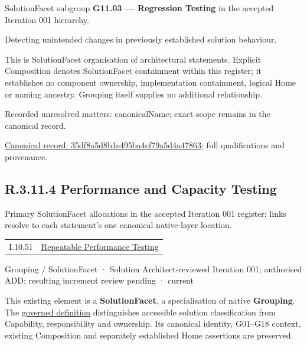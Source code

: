 SolutionFacet subgroup \textbf{G11.03 — Regression Testing} in the accepted Iteration 001 hierarchy.



Detecting unintended changes in previously established solution behaviour.



This is SolutionFacet organisation of architectural statements. Explicit Composition denotes SolutionFacet containment within this register; it establishes no component ownership, implementation containment, logical Home or naming ancestry. Grouping itself supplies no additional relationship.


{\small Recorded unresolved matters: canonicalName; exact scope remains in the canonical record.}\par
{\footnotesize \href{../../../../../../../continuum/grouping/35df8a5d8b1e495ba4cf79a5d4a47863.md}{Canonical record: 35df8a5d8b1e495ba4cf79a5d4a47863}; full qualifications and provenance.}\par
\subsection*{R.3.11.4 Performance and Capacity Testing}
\label{navigation:R.3.11.4}

Primary SolutionFacet allocations in the accepted Iteration 001 register; links resolve to each statement’s one canonical native-layer location.\par
\begin{longtable}{p{.22\linewidth}p{.73\linewidth}}
I.10.51 & \hyperref[element:1c2eb4d9aef4425288528907fed7ebc2]{Repeatable Performance Testing} \\
\end{longtable}
\label{element:cd453ee30502406db647a0c5b4011739}
{\small Grouping / SolutionFacet · Solution Architect-reviewed Iteration 001; authorised ADD; resulting increment review pending · current}\par

This existing element is a \textbf{SolutionFacet}, a specialisation of native
\textbf{Grouping}. The \href{\detokenize{../../../../../../../governance/continuum-representation.md#solutionfacet-classification--1119-candidate}}{governed definition}
distinguishes accessible solution classification from Capability, responsibility
and ownership. Its canonical identity, G01–G18 context, existing Composition
and separately established Home assertions are preserved.



